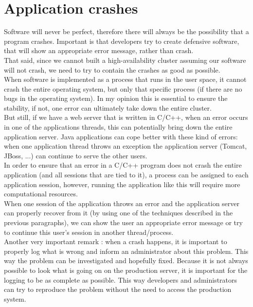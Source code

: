 \documentclass[12pt]{report}
\begin{document}
\section{Application crashes}
Software will never be perfect, therefore there will always be the possibility
that a program crashes. Important is that developers try to
create defensive software, that will show an
appropriate error message, rather than crash.\\
That said, since we cannot built a high-availability cluster assuming
our software will not crash, we need to try to contain the crashes as
good as possible.\\
When software is implemented as a process that runs in the user space,
it cannot crash the entire operating system, but only that specific process (if
there are no bugs in the operating system). In my opinion this is
essential to ensure the stability, if not, one error can ultimately
take down the entire cluster.\\
But still, if we have a web server that is written in C/C++, when an
error occurs in one of the applications threads, this can potentially
bring down the entire application server. Java applications can cope
better with these kind of errors: when one application thread throws
an exception the application server (Tomcat, JBoss, ...) can continue
to serve the other users.\\ 
In order to ensure that an error in a  C/C++ program does not crash the entire
application (and all sessions that are tied to it),  a process can be
assigned to each application session, however, running the application
like this will require more computational resources.\\
When one session of the application throws an error and the
application server can properly recover from it (by using one of the
techniques described in the previous paragraphs), we can show the
user an appropriate error message or try to continue this user's
session in another thread/process.\\
Another very important remark : when a crash happens, it is important
to properly log what is wrong and inform an administrator about this
problem. This way the problem can be investigated and hopefully
fixed. 
Because it is not always possible to look what is
going on on the production server, it is important for the logging to
be as complete as possible. This way developers and administrators can try to
reproduce the problem without the need to access the production system.
\end{document}
